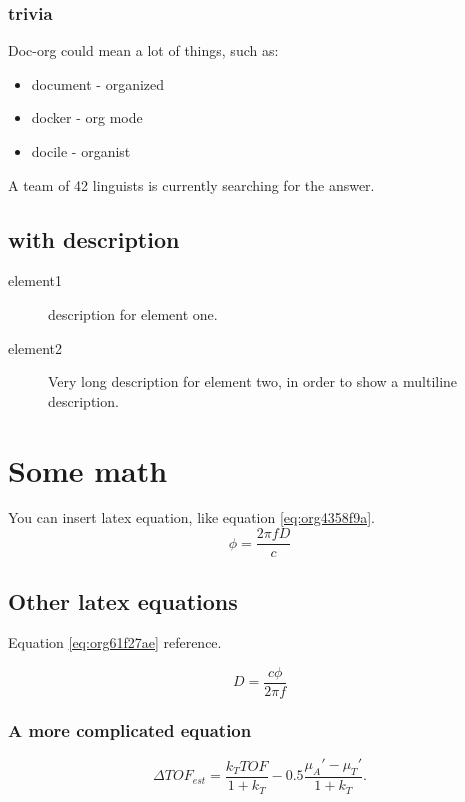 \documentclass[11pt]{article}
\begin{document}
\subsubsection{trivia}
\label{sec:org31998b2}
Doc-org could mean a lot of things, such as:
\begin{itemize}
\item document - organized
\item docker - org mode
\item docile - organist
\end{itemize}
A team of 42 linguists is currently searching for the answer.
\subsection{with description}
\label{sec:org1e98f40}
\begin{description}
\item[{element1}] description for element one.
\item[{element2}] Very long description for element two, in order to show a
multiline description.
\end{description}

\section{Some math}
\label{sec:org7260ddc}
You can insert latex equation, like equation \ref{eq:org4358f9a}.
\begin{equation}
\label{eq:org4358f9a}
\phi = \frac{2\pi fD}{c}
\end{equation}
\subsection{Other latex equations}
\label{sec:org99f792e}
Equation \ref{eq:org61f27ae} reference.

\begin{equation}
\label{eq:org61f27ae}
D = \frac{c\phi}{2\pi f}
\end{equation}

\subsubsection{A more complicated equation}
\label{sec:org6ad323b}

\begin{equation}
\Delta TOF_{est} = \frac{k_T TOF}{1+k_T } - 0.5 \frac{\mu_A' - \mu_T'}{1+k_T}.
\end{equation}
\end{document}
